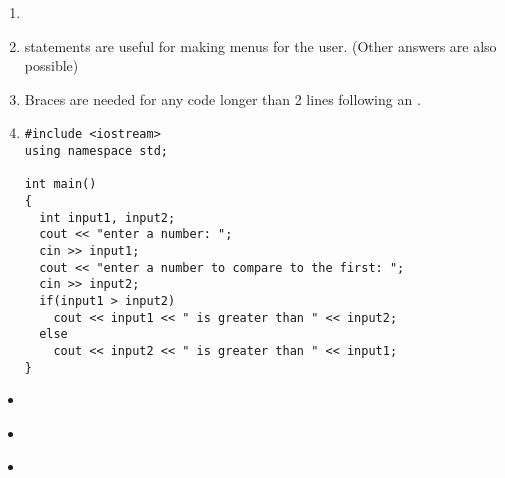 
\begin{enumerate}
\item {}
\item {} statements are useful for making menus for the user. (Other answers are also possible)
\item Braces are needed for any code longer than 2 lines following an .
\item \noindent\begin{minipage}{\linewidth}\begin{lstlisting}
#include <iostream>
using namespace std;

int main()
{
  int input1, input2;
  cout << "enter a number: ";
  cin >> input1;
  cout << "enter a number to compare to the first: ";
  cin >> input2;
  if(input1 > input2)
    cout << input1 << " is greater than " << input2;
  else
    cout << input2 << " is greater than " << input1;
}
\end{lstlisting}\end{minipage}

\end{enumerate}


\begin{itemize}
\item ~
\item ~
\item ~
\end{itemize}	

